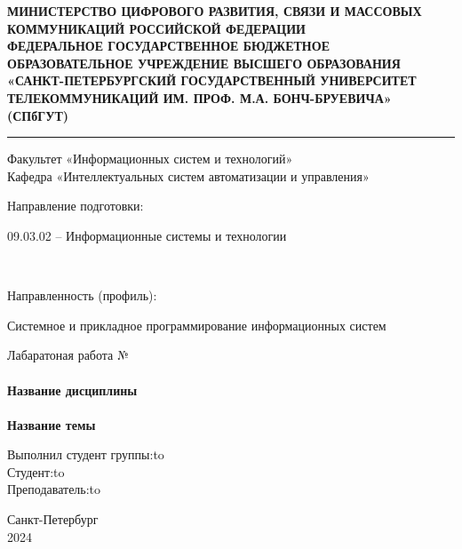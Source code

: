 \begin{center}
\bf{\large{МИНИСТЕРСТВО ЦИФРОВОГО РАЗВИТИЯ, СВЯЗИ И МАССОВЫХ КОММУНИКАЦИЙ РОССИЙСКОЙ ФЕДЕРАЦИИ}\\
\footnotesize{ФЕДЕРАЛЬНОЕ ГОСУДАРСТВЕННОЕ БЮДЖЕТНОЕ ОБРАЗОВАТЕЛЬНОЕ УЧРЕЖДЕНИЕ ВЫСШЕГО ОБРАЗОВАНИЯ}\\ 
\small{\textbf{«САНКТ-ПЕТЕРБУРГСКИЙ ГОСУДАРСТВЕННЫЙ УНИВЕРСИТЕТ ТЕЛЕКОММУНИКАЦИЙ ИМ. ПРОФ. М.А. БОНЧ-БРУЕВИЧА» (СПбГУТ)}}}\\

\par\noindent\rule{\textwidth}{0.5pt}

\vspace{2em}
Факультет «Информационных систем и технологий»\\
Кафедра «Интеллектуальных систем автоматизации и управления»\\
\vspace{3em}

\begin{minipage}{0.4\textwidth}
Направление подготовки: 
\end{minipage}
\hfill
\bigskip
\begin{minipage}{0.45\textwidth}
09.03.02 – Информационные системы и технологии
\end{minipage}\\

\begin{minipage}{0.4\textwidth}
Направленность (профиль): 
\end{minipage}
\hfill
\begin{minipage}{0.45\textwidth}
Системное и прикладное программирование информационных систем
\end{minipage}

\vspace{3em}

\large{Лабаратоная работа №}\\
\hfill \break 
\small \normalsize {}\\
\bf{Название дисциплины}\\
\hfill \break 
\normalsize {}\\
\bf{Название темы}\\
\end{center}

\vspace{4em}
 
\newbox{\lbox}
\newlength{\maxl}
\setlength{\maxl}{\wd\lbox}
\hfill\parbox{11cm}{
\hspace*{6cm}\hspace*{-6cm}Выполнил студент группы:\hfill\hbox to\\
\hspace*{5cm}\hspace*{-5cm}Студент:\hfill\hbox to\\
\hspace*{5cm}\hspace*{-5cm}Преподаватель:\hfill\hbox to\\
}

\hfill \break
\vspace*{\fill}
\begin{center} Санкт-Петербург\\2024\end{center}
\thispagestyle{empty}
 
